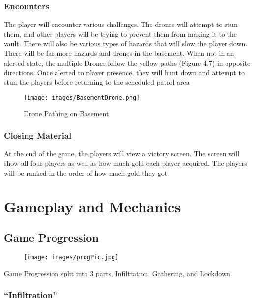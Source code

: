\documentclass[10pt]{report}
\begin{document}
\subsection{Encounters}

The player will encounter various challenges. The drones will attempt to stun them, and other players will be trying to prevent them from making it to the vault. There will also be various types of hazards that will slow the player down. There will be far more hazards and drones in the basement. When not in an alerted state, the multiple Drones follow the yellow paths (Figure 4.7) in opposite directions. Once alerted to player presence, they will hunt down and attempt to stun the players before returning to the scheduled patrol area

\begin{figure}[H]
    \centering
    \texttt{[image: images/BasementDrone.png]}
    \caption{Drone Pathing on Basement}
\end{figure}

\subsection{Closing Material}

At the end of the game, the players will view a victory screen. The screen will show all four players as well as how much gold each player acquired. The players will be ranked in the order of how much gold they got

\chapter{Gameplay and Mechanics}

\section{Game Progression}

\begin{figure}
    \centering
    \texttt{[image: images/progPic.jpg]}
    \caption{}
\end{figure}

Game Progression split into 3 parts, Infiltration, Gathering, and Lockdown.

\subsection{``Infiltration''}
\end{document}

